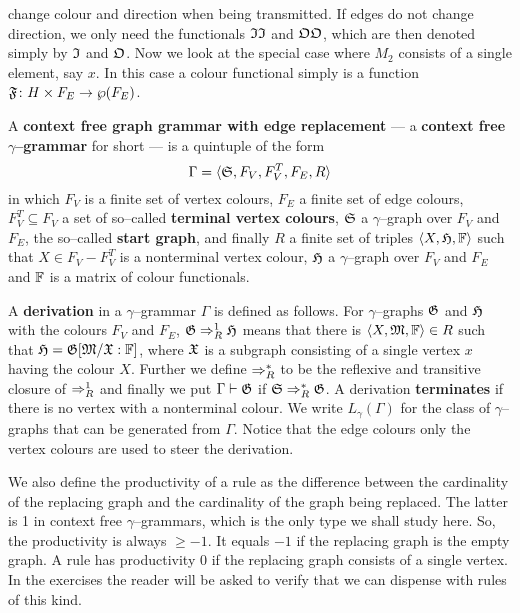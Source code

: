 change colour and direction when being transmitted.
If edges do not change direction, we only need the functionals
$\mathfrak{II}$ and $\mathfrak{OO}$, which are then denoted simply by
$\mathfrak{I}$ and $\mathfrak{O}$. Now we look at the special case where
$M_2$ consists of a single element, say $x$. In this case a
colour functional simply is a function $\GF \colon H \times F_E \pf %
\wp(F_E)$.
\begin{defn}
A \textbf{context free graph grammar with edge replacement} ---
a \textbf{context free $\gamma$--grammar} for short --- is a
quintuple of the form
\begin{equation}
\Gamma = \langle \mathfrak{S}, F_V, F^T_V, F_E, R\rangle
\end{equation}
in which $F_V$ is a finite set of vertex colours, $F_E$
a finite set of edge colours, $F_V^T \subseteq F_V$
a set of so--called \textbf{terminal vertex colours}, $\mathfrak{S}$ a
$\gamma$--graph over $F_V$ and $F_E$, the so--called
\textbf{start graph}, and finally $R$ a finite set of triples
$\langle X, \mathfrak{H}, \mathbb{F}\rangle$ such that $X \in F_V - F_V^T$ is a
nonterminal vertex colour, $\mathfrak{H}$ a $\gamma$--graph over $F_V$
and $F_E$ and $\mathbb{F}$ is a matrix of colour functionals.
\end{defn}
A \textbf{derivation} in a $\gamma$--grammar $\Gamma$ is defined as 
follows.  For $\gamma$--graphs $\mathfrak{G}$ and $\mathfrak{H}$ with the colours
$F_V$ and $F_E$, $\mathfrak{G} \Rightarrow^1_R \mathfrak{H}$ means that there is
$\langle X, \mathfrak{M}, \mathbb{F}\rangle \in R$ such that $\mathfrak{H} = \mathfrak{G} [\mathfrak{M}/\mathfrak{X} : \mathbb{F}]$,
where $\mathfrak{X}$ is a subgraph consisting of a single vertex $x$
having the colour $X$. Further we define $\Rightarrow^{\ast}_R$ to be
the reflexive and transitive closure of $\Rightarrow^1_R$ and finally we put
$\Gamma \vdash \mathfrak{G}$ if $\mathfrak{S} \Rightarrow^{\ast}_R \mathfrak{G}$. A derivation
\textbf{terminates} if there is no vertex with a nonterminal colour.
We write $L_{\gamma}(\Gamma)$ for the class of $\gamma$--graphs
that can be generated from $\Gamma$. Notice that the edge colours
only the vertex colours are used to steer the derivation.

We also define the productivity of a rule as the difference
between the cardinality of the replacing graph and the cardinality
of the graph being replaced. The latter is 1 in context free
$\gamma$--grammars, which is the only type we shall study here. So, 
the productivity is always $\geq - 1$. It equals $-1$ if the replacing 
graph is the empty graph. A rule has productivity $0$ if the replacing 
graph consists of a single vertex. In the exercises the reader will 
be asked to verify that we can dispense with rules of this kind.

